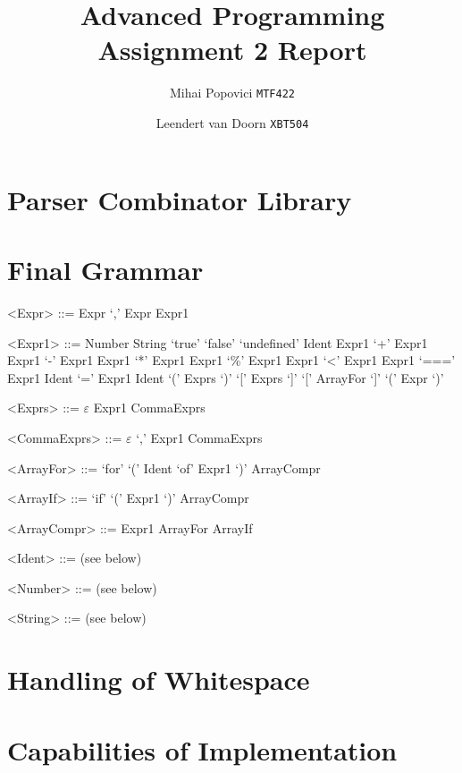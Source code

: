 \documentclass{article}
\title{Advanced Programming Assignment 2 Report}
\author{Mihai Popovici \texttt{MTF422} \and Leendert van Doorn \texttt{XBT504}}
\begin{document}
\maketitle




\section{Parser Combinator Library}


\section{Final Grammar}

\setlength{\grammarparsep}{4pt plus 1pt minus 1pt} %
\setlength{\grammarindent}{9em} %

\begin{grammar}
	\let\syntleft\relax
	\let\syntright\relax
	
	<Expr> ::= Expr `,' Expr
	\alt Expr1

	<Expr1> ::= Number
	\alt String
	\alt `true'
	\alt `false'
	\alt `undefined'
	\alt Ident
	\alt Expr1 `+' Expr1
	\alt Expr1 `-' Expr1
	\alt Expr1 `*' Expr1
	\alt Expr1 `\%' Expr1
	\alt Expr1 `<' Expr1
	\alt Expr1 `===' Expr1
	\alt Ident `=' Expr1
	\alt Ident `(' Exprs `)'
	\alt `[' Exprs `]'
	\alt `[' ArrayFor `]'
	\alt `(' Expr `)'
	
	<Exprs> ::= $\varepsilon$
	\alt Expr1 CommaExprs	
	
	<CommaExprs> ::= $\varepsilon$
	\alt `,' Expr1 CommaExprs
	
	<ArrayFor> ::= `for' `(' Ident `of' Expr1 `)' ArrayCompr
	
	<ArrayIf> ::= `if' `(' Expr1 `)' ArrayCompr
	
	<ArrayCompr> ::= Expr1
	\alt ArrayFor
	\alt ArrayIf
	
	<Ident> ::= (see below)
	
	<Number> ::= (see below)
	
	<String> ::= (see below)
\end{grammar}


\section{Handling of Whitespace}


\section{Capabilities of Implementation}
\end{document}
